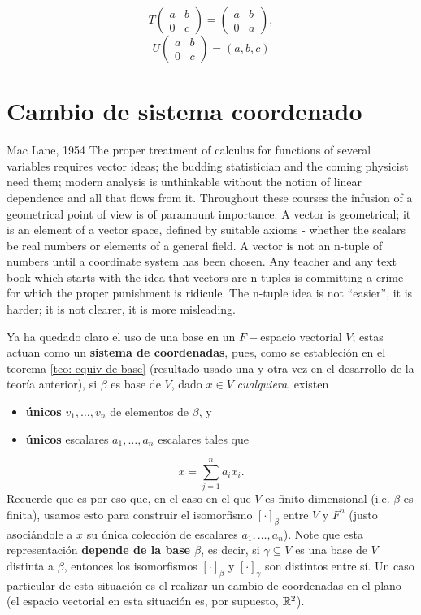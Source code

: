 \[
T \begin{pmatrix}
a & b \\
0 & c
\end{pmatrix} = 
\begin{pmatrix}
a & b \\
0 & a
\end{pmatrix} ,
\]
\[
U
\begin{pmatrix}
a & b \\
0 & c
\end{pmatrix} = 
(a, b, c)
\]

\section{Cambio de sistema coordenado}

\begin{signquote}{Mac Lane, 1954}
    The proper treatment of calculus for functions of 
several variables requires vector ideas; the budding statistician and
the coming physicist need them; modern 
analysis is unthinkable without the notion of linear
dependence and all that flows from it. Throughout these
courses the infusion of a geometrical point of view is of paramount 
importance. A vector is geometrical; it is an element of a vector space,
defined by suitable axioms - whether the scalars be real numbers or
elements of a general field. A vector is not an n-tuple of numbers
until a coordinate system has been chosen. Any teacher and any
text book which starts with the idea that vectors are
n-tuples is committing a crime for which the proper punishment is ridicule.
The n-tuple idea is not ``easier'', it is harder; it is not clearer, it is
more misleading. 
\end{signquote}


Ya ha quedado claro el uso de una base en un $F-$espacio 
vectorial $V$; estas actuan como un
\textbf{sistema de coordenadas}, pues, como se estableción
en el teorema \ref{teo: equiv de base}
(resultado usado una y otra vez en el desarrollo
de la teoría anterior), si $\beta$ es base de $V$,
dado $x \in V$ \textit{cualquiera}, existen
\begin{itemize}
	\item \textbf{únicos} $v_{1}, \ldots, v_{n}$ de elementos 
	de $\beta$, y
	\item \textbf{únicos} escalares $a_{1}, \ldots, a_{n}$ escalares
	tales que
\end{itemize}
\[
x = \sum_{j = 1}^{n} a_{i} x_{i}.
\]
Recuerde que es por eso que, en el caso en el que $V$ es finito dimensional
(i.e. $\beta$ es finita), usamos esto para construir el isomorfismo
$[\cdot]_{\beta}$ entre $V$ y $F^{n}$ (justo asociándole a $x$ su única
colección de escalares $a_{1}, \ldots, a_{n}$). Note que esta representación
\textbf{depende de la base $\beta$}, es decir, si $\gamma \subseteq V$
es una base de $V$ distinta a $\beta$, entonces los isomorfismos
$[\cdot]_{\beta}$
y $[\cdot]_{\gamma}$ son distintos entre sí. Un caso particular de esta
situación es el realizar un cambio de coordenadas en el plano
(el espacio vectorial en esta situación es, por supuesto, $\mathbb{R}^{2}$).

